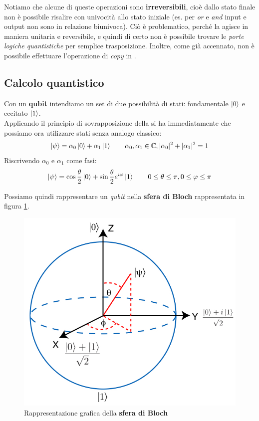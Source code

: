 \documentclass[../../InformazioneQuantistica.tex]{subfiles}
\begin{document}
Notiamo che alcune di queste operazioni sono \textbf{irreversibili}, cioè dallo stato finale non è possibile risalire con univocità allo stato iniziale (es. per \textit{or} e \textit{and} input e output non sono in relazione biunivoca). Ciò è problematico, perché la \MQ agisce in maniera unitaria e reversibile, e quindi di certo non è possibile trovare le \textit{porte logiche quantistiche} per semplice trasposizione. Inoltre, come già accennato, non è possibile effettuare l'operazione di \textit{copy} in \MQ.

\subsection{Calcolo quantistico}
Con un \textbf{qubit} intendiamo un set di due possibilità di stati: fondamentale $\Ket{0}$ e eccitato $\Ket{1}$.\\
Applicando il principio di sovrapposizione della \MQ si ha immediatamente che possiamo ora utilizzare stati senza analogo classico:
\begin{align*}
\Ket{\psi} = \alpha_0 \Ket{0} + \alpha_1 \Ket{1} \qquad \alpha_0, \alpha_1 \in \mathbb{C}, |\alpha_0|^2 + |\alpha_1|^2 = 1
\end{align*}
Riscrivendo $\alpha_0$ e $\alpha_1$ come fasi:
\begin{align*}
\Ket{\psi} = \cos\frac{\theta}{2} \Ket{0} + \sin\frac{\theta}{2} e^{i\varphi} \Ket{1} \qquad 0\leq \theta \leq \pi, 0 \leq \varphi \leq \pi
\end{align*}

Possiamo quindi rappresentare un \textit{qubit} nella \textbf{sfera di Bloch} rappresentata in figura \ref{fig:blochsphere}.

\begin{figure}[H]
\centering
\includegraphics[scale=0.4]{Immagini/27_2/image002.png}
\caption{Rappresentazione grafica della \textbf{sfera di Bloch}\label{fig:blochsphere}}
\end{figure}
\end{document}

